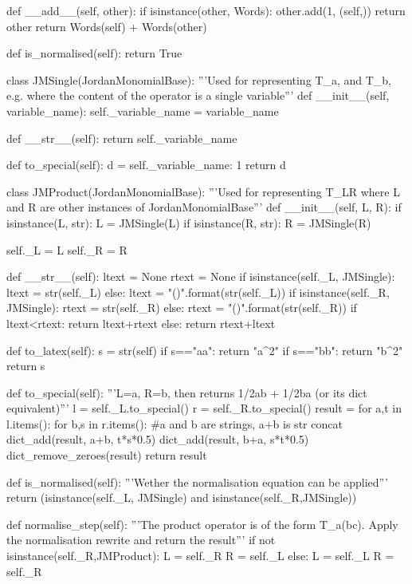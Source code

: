 \documentclass{article}
\begin{document}
\begin{python}
    def __add__(self, other):
        if isinstance(other, Words):
            other.add(1, (self,))
            return other
        return Words(self) + Words(other)

    def is_normalised(self):
        return True

class JMSingle(JordanMonomialBase):
    '''Used for representing T_a, and T_b, e.g. where
    the content of the operator is a single variable'''
    def __init__(self, variable_name):
        self._variable_name = variable_name

    def __str__(self):
        return self._variable_name

    def to_special(self):
        d = {self._variable_name: 1}
        return d

class JMProduct(JordanMonomialBase):
    '''Used for representing T_{LR} where L and R are
    other instances of JordanMonomialBase'''
    def __init__(self, L, R):
        if isinstance(L, str):
            L = JMSingle(L)
        if isinstance(R, str):
            R = JMSingle(R)

        self._L = L
        self._R = R

    def __str__(self):
        ltext = None
        rtext = None
        if isinstance(self._L, JMSingle):
            ltext = str(self._L)
        else:
            ltext = "({})".format(str(self._L))
        if isinstance(self._R, JMSingle):
            rtext = str(self._R)
        else:
            rtext = "({})".format(str(self._R))
        if ltext<rtext:
            return ltext+rtext
        else:
            return rtext+ltext

    def to_latex(self):
        s = str(self)
        if s=="aa": return "a^2"
        if s=="bb": return "b^2"
        return s

    def to_special(self):
        '''L=a, R=b, then returns 1/2ab + 1/2ba (or its dict equivalent)'''
        l = self._L.to_special()
        r = self._R.to_special()
        result = {}
        for a,t in l.items():
            for b,s in r.items(): #a and b are strings, a+b is str concat
                dict_add(result, a+b, t*s*0.5)
                dict_add(result, b+a, s*t*0.5)
        dict_remove_zeroes(result)
        return result

    def is_normalised(self):
        '''Wether the normalisation equation can be applied'''
        return (isinstance(self._L, JMSingle) and isinstance(self._R,JMSingle))

    def normalise_step(self):
        '''The product operator is of the form T_{a(bc)}. 
        Apply the normalisation rewrite and return the result'''
        if not isinstance(self._R,JMProduct):
            L = self._R
            R = self._L
        else:
            L = self._L
            R = self._R
        

\end{python}
\end{document}
